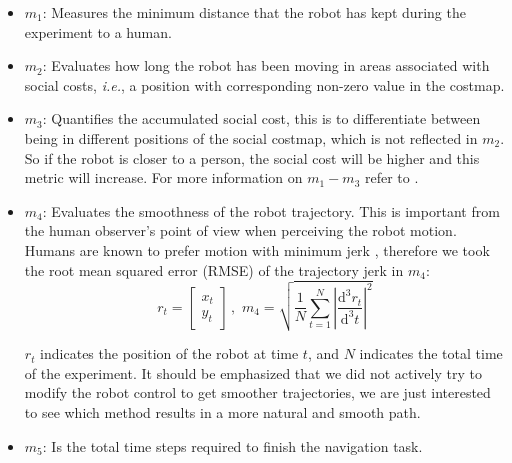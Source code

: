 \begin{itemize}[ noitemsep, leftmargin=*]

\item $m_{1}$: Measures the minimum distance that the robot has kept during the experiment to a human.%


\item $m_{2}$: Evaluates how long the robot has been moving in areas associated with social costs, \textit{i.e.}, a position with corresponding non-zero value in the costmap.

\item $m_{3}$: Quantifies the accumulated social cost, this is to differentiate between being in different positions of the social costmap, which is not reflected in $m_{2}$. So if the robot is closer to a person, the social cost will be higher and this metric will increase. For more information on $m_{1}-m_{3}$ refer to \cite{talebpour2015board}. 

\item  $m_{4}$: Evaluates the smoothness of the robot trajectory. This is important from the human observer's point of view when perceiving the robot motion. Humans are known to prefer motion with minimum jerk \cite{sisbot2010synthesizing}, therefore we took the root mean squared error (RMSE) of the trajectory jerk in $m_{4}$:
\begin{equation}
r_{t} = \begin{bmatrix}
x_{t}\\
y_{t} 

\end{bmatrix} \, , \, \,  
m_{4} = \sqrt{\frac{1}{N} \sum_{t=1}^{N}\left | \frac{\mathrm{d^3} r_{t} }{\mathrm{d^3} t} \right |^{2}  }
\end{equation}


$r_{t}$ indicates the position of the robot at time $t$, and $N$ indicates the total time of the experiment. It should be emphasized that we did not actively try to modify the robot control to get smoother trajectories, we are just interested to see which method results in a more natural and smooth path.  

\item $m_{5}$: Is the total time steps required to finish the navigation task.



\end{itemize}

